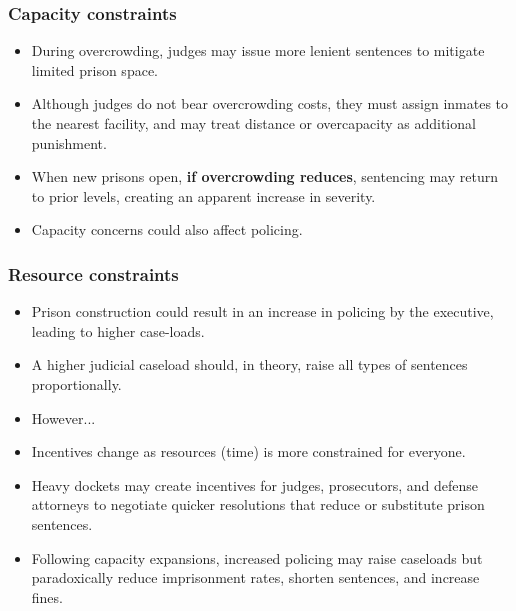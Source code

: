 \documentclass[12pt]{beamer}
\begin{document}
\begin{frame}
\frametitle{Capacity constraints}
\small
\begin{itemize}
     \item During overcrowding, judges may issue more lenient sentences to mitigate limited prison space.  
    \item Although judges do not bear overcrowding costs, they must assign inmates to the nearest facility, and may treat distance or overcapacity as additional punishment.  
    \item When new prisons open, \textbf{if overcrowding reduces}, sentencing may return to prior levels, creating an apparent increase in severity.  
    \item Capacity concerns could also affect policing.
     
\end{itemize}
\end{frame}

\begin{frame}
\frametitle{Resource constraints}
\small
\begin{itemize}
    \item Prison construction could result in an increase in policing by the executive, leading to higher case-loads.
    \item A higher judicial caseload should, in theory, raise all types of sentences proportionally.  
    \item However...
    \item Incentives change as resources (time) is more constrained for everyone.
    \item Heavy dockets may create incentives for judges, prosecutors, and defense attorneys to negotiate quicker resolutions that reduce or substitute prison sentences.  
    \item Following capacity expansions, increased policing may raise caseloads but paradoxically reduce imprisonment rates, shorten sentences, and increase fines.  
\end{itemize}
\end{frame}
\end{document}
